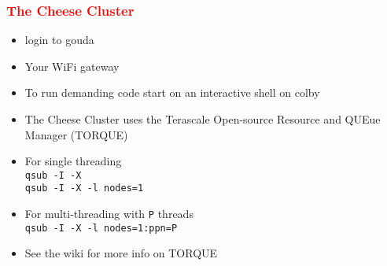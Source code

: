 \documentclass[11pt,pdftex,dvipsnames,usenames,helvetica]{beamer}
\begin{document}
\begin{frame}
\frametitle{\textcolor{red}{The Cheese Cluster}}%

\begin{itemize}
\item login to gouda %
\item Your WiFi gateway
\item To run demanding code start on an interactive shell on colby
\item The Cheese Cluster uses the Terascale Open-source Resource and QUEue Manager (TORQUE)
\item For single threading\\ 
{\tt qsub -I -X}\\
{\tt qsub -I -X -l nodes=1} 
\item For multi-threading with {\tt P} threads\\
{\tt qsub -I -X -l nodes=1:ppn=P} 
\item See the wiki for more info on TORQUE

\end{itemize}

\end{frame}
\end{document}
